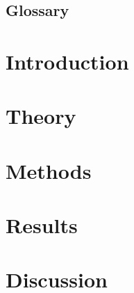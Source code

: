 \documentclass[12pt,a4paper,twoside,openright]{report}
\begin{document}



\newpage


\newpage


\newpage
\tableofcontents


\cleardoublepage
{}
\listoffigures

\cleardoublepage
{}
\listoftables

\newpage
\section*{Glossary}
    
\thispagestyle{plain}

\cleardoublepage
\setcounter{page}{1}
\setlength{\parskip}{10pt}


\chapter{Introduction}
    

\chapter{Theory}
    

\chapter{Methods}
    

\chapter{Results}
    

\chapter{Discussion}
    
\end{document}
